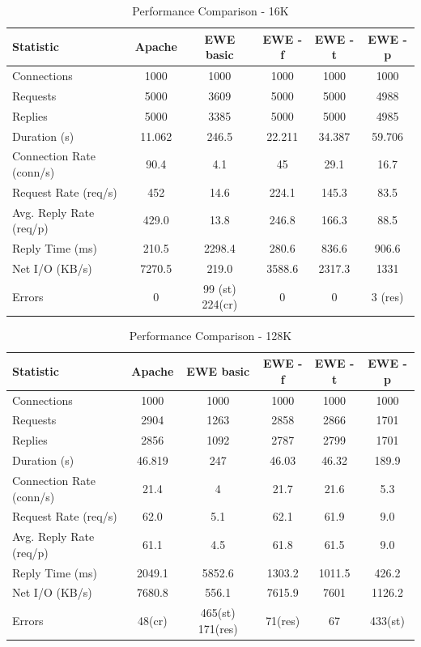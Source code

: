 \documentclass{article}
\begin{document}
\begin{table}[h]
\begin{tabular}{|l|c|c|c|c|c|}
\hline
Statistic & Apache & EWE basic & EWE -f & EWE -t & EWE -p \\
\hline 
Connections & 1000 & 1000 & 1000 & 1000 & 1000  \\
Requests & 5000 & 3609 & 5000 & 5000 & 4988 \\
Replies & 5000 & 3385 & 5000 & 5000 & 4985 \\
Duration (s)& 11.062 & 246.5 & 22.211 & 34.387 & 59.706 \\
Connection Rate (conn/s)& 90.4 & 4.1 & 45 & 29.1 & 16.7 \\
Request Rate (req/s)& 452 & 14.6 & 224.1 & 145.3 & 83.5 \\
Avg. Reply Rate (req/p)& 429.0 & 13.8  & 246.8 & 166.3 & 88.5 \\
Reply Time (ms)& 210.5 & 2298.4 & 280.6 & 836.6 & 906.6 \\
Net I/O (KB/s)& 7270.5 & 219.0 & 3588.6 & 2317.3 & 1331 \\
Errors & 0  & 99 (st) 224(cr) & 0 & 0 & 3 (res) \\
\hline
\end{tabular}
\caption{Performance Comparison - 16K}\label{perf16K}
\end{table}

\begin{table}[h]
\begin{tabular}{|l|c|c|c|c|c|}
\hline
Statistic & Apache & EWE basic & EWE -f & EWE -t & EWE -p \\
\hline 
Connections & 1000 & 1000 & 1000 & 1000 & 1000 \\
Requests & 2904 & 1263 & 2858 & 2866 & 1701 \\
Replies & 2856 & 1092 & 2787 & 2799 & 1701 \\
Duration (s)& 46.819 & 247 & 46.03 & 46.32 & 189.9 \\
Connection Rate (conn/s)& 21.4 & 4 & 21.7 & 21.6 & 5.3 \\
Request Rate (req/s)& 62.0 & 5.1 & 62.1 & 61.9 & 9.0 \\
Avg. Reply Rate (req/p)& 61.1 & 4.5 & 61.8 & 61.5 & 9.0 \\
Reply Time (ms)& 2049.1 & 5852.6 & 1303.2 & 1011.5 & 426.2 \\
Net I/O (KB/s)& 7680.8 & 556.1 & 7615.9 & 7601 & 1126.2 \\
Errors & 48(cr) & 465(st) 171(res) & 71(res) & 67 & 433(st) \\
\hline
\end{tabular}
\caption{Performance Comparison - 128K}\label{perf128K}
\end{table}
\end{document}
